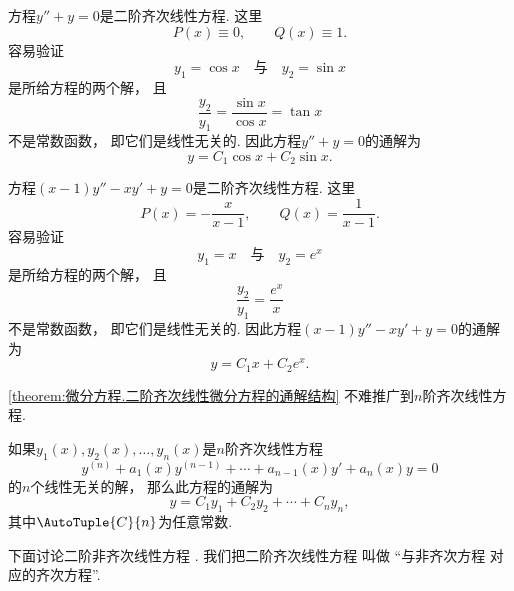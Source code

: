 \begin{example}
方程\(y'' + y = 0\)是二阶齐次线性方程.
这里\[
	P(x)\equiv0,
	\qquad
	Q(x)\equiv1.
\]
容易验证\[
	y_1 = \cos x
	\quad\text{与}\quad
	y_2 = \sin x
\]
是所给方程的两个解，
且\[
	\frac{y_2}{y_1}
	= \frac{\sin x}{\cos x}
	= \tan x
\]不是常数函数，
即它们是线性无关的.
因此方程\(y'' + y = 0\)的通解为\[
	y = C_1 \cos x + C_2 \sin x.
\]
\end{example}
\begin{example}
方程\((x-1) y'' - x y' + y = 0\)是二阶齐次线性方程.
这里\[
	P(x)=-\frac{x}{x-1},
	\qquad
	Q(x)=\frac1{x-1}.
\]
容易验证\[
	y_1 = x
	\quad\text{与}\quad
	y_2 = e^x
\]是所给方程的两个解，
且\[
	\frac{y_2}{y_1}
	= \frac{e^x}{x}
\]不是常数函数，
即它们是线性无关的.
因此方程\((x-1) y'' - x y' + y = 0\)的通解为\[
	y = C_1 x + C_2 e^x.
\]
\end{example}

\cref{theorem:微分方程.二阶齐次线性微分方程的通解结构} 不难推广到\(n\)阶齐次线性方程.
\begin{corollary}\label{theorem:微分方程.n阶齐次线性微分方程的通解结构}
如果\(y_1(x),y_2(x),\dotsc,y_n(x)\)是\(n\)阶齐次线性方程\[
	y^{(n)} + a_1(x) y^{(n-1)} + \dotsb + a_{n-1}(x) y' + a_n(x) y = 0
\]的\(n\)个线性无关的解，
那么此方程的通解为\[
	y = C_1 y_1 + C_2 y_2 + \dotsb + C_n y_n,
\]
其中\(\AutoTuple{C}{n}\)为任意常数.
\end{corollary}

下面讨论二阶非齐次线性方程 .
我们把二阶齐次线性方程  叫做%
“与非齐次方程  对应的齐次方程”.


